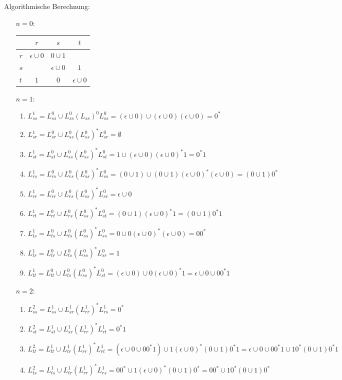 \documentclass{article}
\begin{document}
Algorithmische Berechnung:
\begin{enumerate}
	\item[$n = 0$:]
	
	\begin{tabular}{l|ccc}
		& $r$ & $s$ & $t$ \\\hline
		$r$ & $\epsilon \cup 0$  &  $0 \cup 1$ & \\
		$s$ & & $\epsilon \cup 0$ & $1$ \\
		$t$ & $1$ & $0$ & $\epsilon \cup 0$
	\end{tabular}
	\item[$n = 1:$]
	
	\begin{enumerate}[1.]
	\item $L_{ss}^1 = L_{ss}^0 \cup L_{ss}^0 (L_{ss})^0 L_{ss}^0 = (\epsilon \cup 0) \cup (\epsilon \cup 0)(\epsilon \cup 0) = 0^*$
	\item $L_{sr}^1 = L_{sr}^0 \cup L_{ss}^0 (L_{ss}^0)^* L_{sr}^0 = \emptyset$
	\item $L_{st}^1 = L_{st}^0 \cup L_{ss}^0 (L_{ss}^0)^* L_{st}^0 = 1 \cup (\epsilon \cup 0)(\epsilon \cup 0)^* 1 = 0^*1$
	\item $L_{rs}^1 = L_{rs}^0 \cup L_{rs}^0 (L_{ss}^0)^* L_{ss}^0 = (0 \cup 1) \cup (0\cup 1)(\epsilon \cup 0)^* (\epsilon \cup 0) = (0 \cup 1)0^*$
	\item $L_{rr}^1 = L_{rr}^0 \cup L_{rs}^0 (L_{ss}^0)^* L_{sr}^0 = \epsilon \cup 0$
	\item $L_{rt}^1 = L_{rt}^0 \cup L_{rs}^0 (L_{ss}^0)^* L_{st}^0 = (0 \cup 1 )(\epsilon \cup 0)^* 1 = (0\cup 1)0^*1$
	\item $L_{ts}^1 = L_{ts}^0 \cup L_{ts}^0 (L_{ss}^0)^* L_{ss}^0 = 0 \cup 0(\epsilon \cup 0)^* (\epsilon \cup 0) = 00^*$
	\item $L_{tr}^1 = L_{tr}^0 \cup L_{ts}^0 (L_{ss}^0)^* L_{sr}^0 = 1$
	\item $L_{tt}^1 = L_{tt}^0 \cup L_{ts}^0 (L_{ss}^0)^* L_{st}^0 = (\epsilon \cup 0 ) \cup 0(\epsilon \cup 0)^* 1 = \epsilon \cup 0 \cup 00^*1$
	\end{enumerate}

	\item[$n=2:$]
	\begin{enumerate}[1.]
	\item $L_{ss}^2 = L_{ss}^1 \cup L_{sr}^1 (L_{rr}^1 )^* L_{rs}^1 = 0^*$
	\item $L_{st}^2 = L_{st}^1 \cup L_{sr}^1 (L_{rr}^1)^* L_{rt}^1 = 0^*1$
	\item $L_{tt}^2 = L_{tt}^1 \cup L_{tr}^1 (L_{rr}^1)^* L_{rt}^1 = (\epsilon \cup 0 \cup 00^*1) \cup 1 (\epsilon \cup 0)^* (0\cup 1)0^* 1 = \epsilon \cup 0 \cup 00^*1 \cup 10^* (0 \cup 1)0^* 1$
	\item $L_{ts}^2 = L_{ts}^1 \cup L_{tr}^1 (L_{rr}^1 )^* L_{rs}^1 = 00^* \cup 1 (\epsilon \cup 0)^* (0 \cup 1)0^* = 00^* \cup 10^*(0\cup 1)0^* $
	\end{enumerate}


\end{enumerate}
\end{document}
